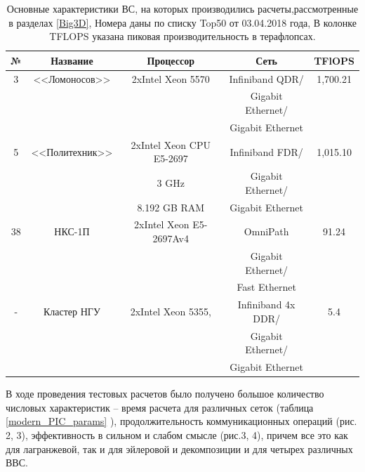 \begin{table}[ht]
	\caption{
		Основные характеристики ВС, на которых производились расчеты,рассмотренные в разделах \ref{Big3D}, Номера даны по списку Top50 от 03.04.2018 года, В колонке TFLOPS указана пиковая производительность в терафлопсах.}
	\begin{center}
		\begin{tabular}{|c|c|c|c|c|}
			\hline
			
			№ & Название       & Процессор                & Сеть                &  TFlOPS\\
			\hline 
			3 & <<Ломоносов>>  &  2xIntel Xeon 5570       &  Infiniband QDR/   &   1,700.21 \\
			&                &                          &  Gigabit Ethernet/ &            \\
			&                &                          &  Gigabit Ethernet  &            \\ \hline
			
			5 & <<Политехник>> & 2xIntel Xeon CPU E5-2697 &  Infiniband FDR/   &   1,015.10 \\
			&                & 3 GHz                    &  Gigabit Ethernet/ &            \\
			&                & 8.192 GB RAM             &  Gigabit Ethernet  &            \\ \hline
			
			38& НКС-1П         & 2xIntel Xeon E5-2697Av4  & OmniPath           & 91.24      \\
			&                 &                          & Gigabit Ethernet/  &            \\
			&                 &                          & Fast Ethernet      &            \\ \hline
			
			- & Кластер НГУ    & 2xIntel Xeon 5355,       &  Infiniband 4x DDR/& 5.4 \\ 
			&			       &                          &   Gigabit Ethernet/&  \\
			&			       &                          &   Gigabit Ethernet &  \\ \hline                    
			
		\end{tabular}
	\end{center}
	\label{top50_2018}
\end{table}


В ходе проведения тестовых расчетов было получено большое количество числовых характеристик – время расчета для различных сеток (таблица \ref{modern_PIC_params} ), продолжительность коммуникационных операций (рис. 2, 3), эффективность в сильном и слабом смысле (рис.3, 4), причем все это как для лагранжевой, так и для эйлеровой и декомпозиции и для четырех различных ВВС. 

